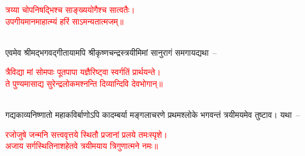 \centering\textcolor{red}{त्रय्या चोपनिषद्भिश्च साङ्ख्ययोगैश्च सात्वतैः। \nopagebreak\\
उपगीयमानमाहात्म्यं हरिं साऽमन्यतात्मजम्॥}\nopagebreak\\
\\
\begin{sloppypar}\justifying\noindent\hspace{10mm} एवमेव श्रीमद्भगवद्गीतायामपि श्रीकृष्ण\-चन्द्रस्त्रयीमिमां सानुरागं समगायद्यथा~–\end{sloppypar}
\centering\textcolor{red}{त्रैविद्या मां सोमपाः पूतपापा यज्ञैरिष्ट्वा स्वर्गतिं प्रार्थयन्ते। \nopagebreak\\
ते पुण्यमासाद्य सुरेन्द्रलोकमश्नन्ति दिव्यान्दिवि देवभोगान्॥}\nopagebreak\\
\\
\begin{sloppypar}\justifying\noindent\hspace{10mm} गद्य\-काव्य\-निष्णातो महाकविर्बाणोऽपि कादम्बर्या मङ्गलाचरणे प्रथम\-श्लोके भगवन्तं त्रयीमयमेव तुष्टाव। यथा~–\end{sloppypar}
\centering\textcolor{red}{रजोजुषे जन्मनि सत्त्ववृत्तये स्थितौ प्रजानां प्रलये तमःस्पृशे।\nopagebreak\\
अजाय सर्गस्थितिनाशहेतवे त्रयीमयाय त्रिगुणात्मने नमः॥}\nopagebreak\\
\\
